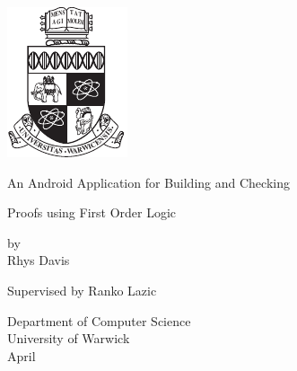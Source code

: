 \thispagestyle{empty}

\begin{spacing}{2}
	\begin{center}
		\includegraphics[scale = 1.9]{Preamble/WarwickCrest.pdf}
	\end{center}
	\begin{center}
		An Android Application for Building and Checking

		Proofs using First Order Logic
		\vspace{5mm}
	\end{center}
	\begin{center}
		by
		\\Rhys Davis
		
		\vspace{20mm}
	\end{center}
	\begin{center}
	Supervised by Ranko Lazic
	\vspace{10mm}
	\end{center}
	\begin{center}
		Department of Computer Science
		\\ University of Warwick
		\\ April 
	\end{center}
\end{spacing}


